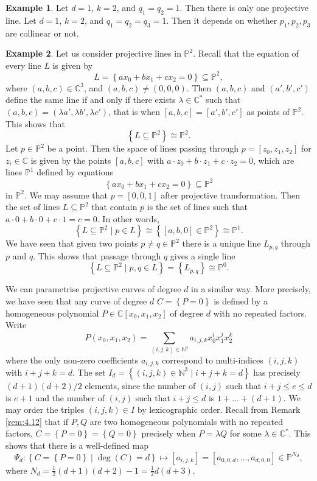 \documentclass{article}
\newcommand{\N}{\mathbb{N}}
\newcommand{\C}{\mathbb{C}}
\renewcommand{\P}{\mathbb{P}}
\newcommand{\rb}[1]{\left( #1 \right)}
\renewcommand{\sb}[1]{\left[ #1 \right]}
\newcommand{\cb}[1]{\left\{ #1 \right\}}
\theoremstyle{definition}\newtheorem{definition}{Definition}[section]
\theoremstyle{definition}\newtheorem{notation}[definition]{Notation}
\theoremstyle{definition}\newtheorem{remark}[definition]{Remark}
\theoremstyle{definition}\newtheorem{example}[definition]{Example}
\theoremstyle{definition}\newtheorem{fact}{Fact}
\theoremstyle{definition}\newtheorem{exercise}{Exercise}
\begin{document}
\begin{example}
Let $ d = 1 $, $ k = 2 $, and $ q_1 = q_2 = 1 $. Then there is only one projective line. Let $ d = 1 $, $ k = 2 $, and $ q_1 = q_2 = q_3 = 1 $. Then it depends on whether $ p_1, p_2, p_3 $ are collinear or not.
\end{example}

\begin{example}
Let us consider projective lines in $ \P^2 $. Recall that the equation of every line $ L $ is given by
$$ L = \cb{ax_0 + bx_1 + cx_2 = 0} \subseteq \P^2, $$
where $ \rb{a, b, c} \in \C^3 $, and $ \rb{a, b, c} \ne \rb{0, 0, 0} $. Then $ \rb{a, b, c} $ and $ \rb{a', b', c'} $ define the same line if and only if there exists $ \lambda \in \C^* $ such that $ \rb{a, b, c} = \rb{\lambda a', \lambda b', \lambda c'} $, that is when $ \sb{a, b, c} = \sb{a', b', c'} $ as points of $ \P^2 $. This shows that
$$ \cb{L \subseteq \P^2} \cong \P^2. $$
Let $ p \in \P^2 $ be a point. Then the space of lines passing through $ p = \sb{z_0, z_1, z_2} $ for $ z_i \in \C $ is given by the points $ \sb{a, b, c} $ with $ a \cdot z_0 + b \cdot z_1 + c \cdot z_2 = 0 $, which are lines $ \P^1 $ defined by equations
$$ \cb{ax_0 + bx_1 + cx_2 = 0} \subseteq \P^2 $$
in $ \P^2 $. We may assume that $ p = \sb{0, 0, 1} $ after projective transformation. Then the set of lines $ L \subseteq \P^2 $ that contain $ p $ is the set of lines such that $ a \cdot 0 + b \cdot 0 + c \cdot 1 = c = 0 $. In other words,
$$ \cb{L \subseteq \P^2 \mid p \in L} \cong \cb{\sb{a, b, 0} \in \P^2} \cong \P^1. $$
We have seen that given two points $ p \ne q \in \P^2 $ there is a unique line $ L_{p, q} $ through $ p $ and $ q $. This shows that passage through $ q $ gives a single line
$$ \cb{L \subseteq \P^2 \mid p, q \in L} = \cb{L_{p, q}} \cong \P^0. $$
\end{example}

We can parametrise projective curves of degree $ d $ in a similar way. More precisely, we have seen that any curve of degree $ d $ $ C = \cb{P = 0} $ is defined by a homogeneous polynomial $ P \in \C\sb{x_0, x_1, x_2} $ of degree $ d $ with no repeated factors. Write
$$ P\rb{x_0, x_1, x_2} = \sum_{\rb{i, j, k} \in \N^3} a_{i, j, k}x_0^ix_1^jx_2^k $$
where the only non-zero coefficients $ a_{i, j, k} $ correspond to multi-indices $ \rb{i, j, k} $ with $ i + j + k = d $. The set $ I_d = \cb{\rb{i, j, k} \in \N^3 \mid i + j + k = d} $ has precisely $ \rb{d + 1}\rb{d + 2} / 2 $ elements, since the number of $ \rb{i, j} $ such that $ i + j \le e \le d $ is $ e + 1 $ and the number of $ \rb{i, j} $ such that $ i + j \le d $ is $ 1 + \dots + \rb{d + 1} $. We may order the triples $ \rb{i, j, k} \in I $ by lexicographic order. Recall from Remark \ref{rem:4.12} that if $ P, Q $ are two homogeneous polynomials with no repeated factors, $ C = \cb{P = 0} = \cb{Q = 0} $ precisely when $ P = \lambda Q $ for some $ \lambda \in \C^* $. This shows that there is a well-defined map
$$ \Psi_d : \cb{C = \cb{P = 0} \mid \deg\rb{C} = d} \mapsto \sb{a_{i, j, k}} = \sb{a_{0, 0, d}, \dots, a_{d, 0, 0}} \in \P^{N_d}, $$
where $ N_d = \tfrac{1}{2}\rb{d + 1}\rb{d + 2} - 1 = \tfrac{1}{2}d\rb{d + 3} $.
\end{document}
